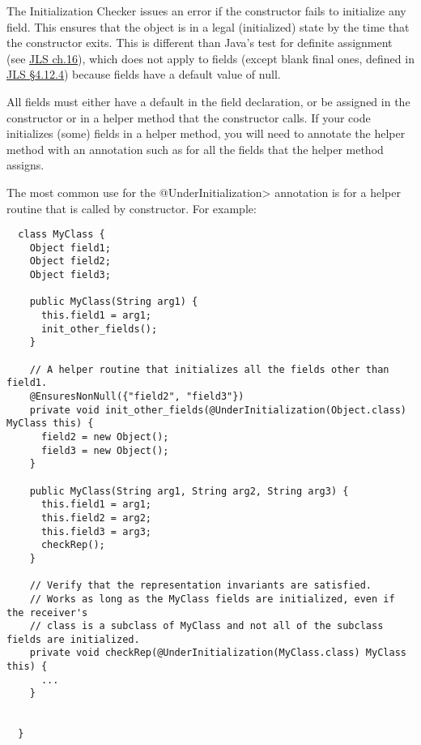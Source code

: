 The Initialization Checker issues an error if the constructor fails to initialize
any  field.  This ensures that the object is in a legal (initialized)
state by the time that the constructor exits.
This is different than Java's test for definite assignment (see
\href{https://docs.oracle.com/javase/specs/jls/se17/html/jls-16.html}{JLS ch.16}),
which does not apply to fields (except blank final ones, defined in
\href{https://docs.oracle.com/javase/specs/jls/se17/html/jls-4.html#jls-4.12.4}{JLS \S 4.12.4}) because fields
have a default value of null.


All  fields must either have a
default in the field declaration, or be assigned in the constructor or in a
helper method that the constructor calls.  If
your code initializes (some) fields in a helper method, you will need to
annotate the helper method with an annotation such as
for all the fields that the helper method assigns.




The most common use for the \<@UnderInitialization> annotation is for a
helper routine that is called by constructor.  For example:

\begin{Verbatim}
  class MyClass {
    Object field1;
    Object field2;
    Object field3;

    public MyClass(String arg1) {
      this.field1 = arg1;
      init_other_fields();
    }

    // A helper routine that initializes all the fields other than field1.
    @EnsuresNonNull({"field2", "field3"})
    private void init_other_fields(@UnderInitialization(Object.class) MyClass this) {
      field2 = new Object();
      field3 = new Object();
    }

    public MyClass(String arg1, String arg2, String arg3) {
      this.field1 = arg1;
      this.field2 = arg2;
      this.field3 = arg3;
      checkRep();
    }

    // Verify that the representation invariants are satisfied.
    // Works as long as the MyClass fields are initialized, even if the receiver's
    // class is a subclass of MyClass and not all of the subclass fields are initialized.
    private void checkRep(@UnderInitialization(MyClass.class) MyClass this) {
      ...
    }


  }
\end{Verbatim}

